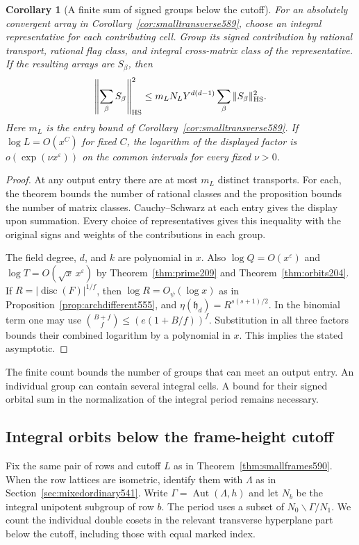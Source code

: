 \documentclass[a4paper,11pt]{article}
\newtheorem{corollary}[proposition]{Corollary}
\theoremstyle{definition}
\theoremstyle{remark}
\numberwithin{equation}{section}
\begin{document}
\begin{corollary}[A finite sum of signed groups below the cutoff]
\leavevmode\label{cor:smallgroups590}
For an absolutely convergent array in
Corollary~\ref{cor:smalltransverse589}, choose an integral
representative for each contributing cell. Group its signed
contribution by rational transport, rational flag class, and
integral cross-matrix class of the representative. If the
resulting arrays are \(S_\beta\), then
\[
           \left\|\sum_\beta S_\beta\right\|_{\rm HS}^2
               \le m_L N_L Y^{d(d-1)}
                            \sum_\beta\|S_\beta\|_{\rm HS}^2 .
\]
Here \(m_L\) is the entry bound of
Corollary~\ref{cor:smalltransverse589}. If
\(\log L=O(x^C)\) for fixed \(C\), the logarithm of the
displayed factor is \(o(\exp(\nu x^\varepsilon))\) on the
common intervals for every fixed \(\nu>0\).
\end{corollary}
\begin{proof}
At any output entry there are at most \(m_L\) distinct
transports. For each, the theorem bounds the number of
rational classes and the proposition bounds the number of
matrix classes. Cauchy--Schwarz at each entry gives the
display upon summation. Every choice of representatives
gives this inequality with the original signs and weights
of the contributions in each group.

The field degree, \(d\), and \(k\) are polynomial in \(x\).
Also \(\log Q=O(x^\varepsilon)\) and
\(\log T=O(\sqrt{x}\,x^\varepsilon)\) by
Theorem~\ref{thm:prime209} and Theorem~\ref{thm:orbits204}.
If \(R=|\operatorname{disc}(F)|^{1/f}\), then
\(\log R=O_\psi(\log x)\) as in
Proposition~\ref{prop:archdifferent555}, and
\(\eta(\mathfrak h_d)=R^{s(s+1)/2}\).
In the binomial term one may use
\(\binom{B+f}{f}\le(e(1+B/f))^f\). Substitution in all
three factors bounds their combined logarithm by a polynomial
in \(x\). This implies the stated asymptotic.
\end{proof}

The finite count bounds the number of groups that can meet
an output entry. An individual group can contain several
integral cells. A bound for their signed orbital sum in the
normalization of the integral period remains necessary.


\subsection{Integral orbits below the frame-height cutoff}
\label{sec:smallorbits591}

Fix the same pair of rows and cutoff \(L\) as in
Theorem~\ref{thm:smallframes590}. When the row lattices are
isometric, identify them with \(\Lambda\) as in
Section~\ref{sec:mixedordinary541}. Write
\(\Gamma=\operatorname{Aut}(\Lambda,h)\) and let \(N_b\) be
the integral unipotent subgroup of row \(b\). The period
uses a subset of \(N_0\backslash\Gamma/N_1\). We count the
individual double cosets in the relevant transverse
hyperplane part below the cutoff, including those with equal
marked index.
\end{document}
